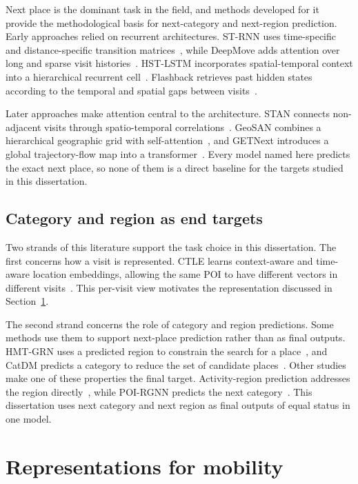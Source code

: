 Next place is the dominant task in the field, and methods developed for it provide the
methodological basis for next-category and next-region prediction. Early approaches
relied on recurrent architectures. ST-RNN uses time-specific and distance-specific
transition matrices~\cite{liu2016strnn}, while DeepMove adds attention over long and
sparse visit histories~\cite{feng2018deepmove}. HST-LSTM incorporates
spatial-temporal context into a hierarchical recurrent cell~\cite{kong2018hstlstm}.
Flashback retrieves past hidden states according to the temporal and spatial gaps
between visits~\cite{yang2020flashback}.

Later approaches make attention central to the architecture. STAN connects
non-adjacent visits through spatio-temporal correlations~\cite{luo2021stan}. GeoSAN
combines a hierarchical geographic grid with self-attention~\cite{lian2020geosan}, and
GETNext introduces a global trajectory-flow map into a
transformer~\cite{yang2022getnext}. Every model named here predicts the exact next
place, so none of them is a direct baseline for the targets studied in this dissertation.

\subsection{Category and region as end targets}

Two strands of this literature support the task choice in this dissertation. The first
concerns how a visit is represented. CTLE learns context-aware and time-aware location
embeddings, allowing the same POI to have different vectors in different
visits~\cite{lin2021ctle}. This per-visit view motivates the representation discussed in
Section~\ref{sec:fund:repr}.

The second strand concerns the role of category and region predictions. Some methods
use them to support next-place prediction rather than as final outputs. HMT-GRN uses a
predicted region to constrain the search for a place~\cite{Lim2022}, and CatDM predicts
a category to reduce the set of candidate places~\cite{yu2020catdm}. Other studies make
one of these properties the final target. Activity-region prediction addresses the
region directly~\cite{zhu2022drrgnn}, while POI-RGNN predicts the next
category~\cite{capanema2023poirgnn}. This dissertation uses next category and next
region as final outputs of equal status in one model.


\section{Representations for mobility}
\label{sec:fund:repr}

